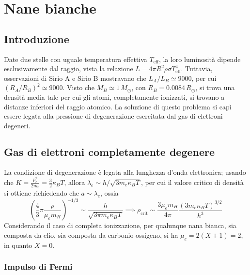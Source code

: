 \documentclass[11pt, a4paper]{scrartcl}
\theoremstyle{style}
\theoremstyle{style1}
\numberwithin{equation}{subsection}
\begin{document}
\newpage



\section{Nane bianche}

\subsection{Introduzione}

Date due stelle con uguale temperatura effettiva $T_\text{eff}$, la loro luminosit\`a dipende esclusivamente dal raggio, vista la relazione $L = 4\pi R^2 \rho  \sigma  T_\text{eff}^4$. 
Tuttavia, osservazioni di Sirio A e Sirio B mostravano che $L_A / L_B \simeq 9000$, per cui $(R_A / R_B)^2 \simeq 9000$.
Visto che $M_B \simeq 1 \, M_\odot $, con $R_B = 0.0084 \, R_\odot$, si trova una densit\`a media tale per cui gli atomi, completamente ionizzati, si trovano a distanze inferiori del raggio atomico.
La soluzione di questo problema si cap\`i essere legata alla pressione di degenerazione esercitata dal gas di elettroni degeneri.

\subsection{Gas di elettroni completamente degenere}
La condizione di degenerazione \`e legata alla lunghezza d'onda elettronica; usando che $K = \frac{p^2_e}{2m_e }=\frac{3}{2}\kappa _B T$, allora $\lambda _e \sim h / \sqrt{3 m_ e \kappa _B T} $, per cui il valore critico di densit\`a si ottiene richiedendo che $a \sim \lambda _e$, ossia
\[
\left(\frac{4}{3} \pi \frac{\rho }{\mu _e m_H}\right) ^{- 1 / 3} \sim \frac{h}{\sqrt{3 \pi m_e \kappa _B T } } \implies \rho _\text{crit} \sim \frac{3\mu _e m_H}{4 \pi}\frac{(3 m_e \kappa _B T )^{3 / 2}}{h^3}
\] 
Considerando il caso di completa ionizzazione, per qualunque nana bianca, sia composta da elio, sia composta da carbonio-ossigeno, si ha $\mu _e = 2 (X+1 )  =2$, in quanto $X = 0$.

\subsubsection{Impulso di Fermi}
\end{document}

